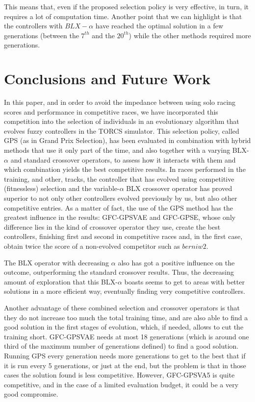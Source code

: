 \documentclass[10pt,journal,compsoc]{IEEEtran}
\begin{document}
This means that, even if the proposed selection policy is very effective, in turn, it requires a lot of computation time.
Another point that we can highlight is that the controllers with
$BLX-\alpha$ have reached the optimal solution in a few generations
(between the $7^{th}$ and the $20^{th}$) while the other methods required more
generations. 
\section{Conclusions and Future Work} 
\label{sec:conclusions}

In this paper, and in order to avoid the impedance between using solo
racing scores and performance in competitive races, we have
incorporated this competition into the selection of individuals in an
evolutionary algorithm that evolves fuzzy controllers in the TORCS
simulator. This selection policy, called GPS (as in Grand Prix
Selection), has been evaluated in combination with hybrid methods that
use it only part of the time, and also together with a varying
BLX-$\alpha$ and standard crossover operators, to assess how it
interacts with them and which combination yields the best competitive
results.
In races performed in the training, and other, tracks, the controller
that has evolved using competitive (fitnessless) selection and the
variable-$\alpha$ BLX crossover operator has proved superior to not
only other controllers evolved previously by us, but also other
competitive entries. As a matter of fact, the use of the GPS method has the greatest
influence in the results: {\sf GFC-GPSVAE} and {\sf GFC-GPSE}, whose only
difference lies in the kind of crossover operator they use, create the
best controllers, finishing first and second in competitive races and,
in the first case, obtain twice the score of a non-evolved
competitor such as $berniw2$.

The  BLX operator with decreasing $\alpha$ also has got a positive
influence on the outcome, outperforming the standard crossover
results. Thus, the decreasing amount of exploration that this BLX-$\alpha$ boasts seems to get to areas with better solutions in a
more efficient way, eventually finding very competitive controllers.

Another advantage of these combined selection and crossover operators is that they do not
increase too much the total training time, and are also able to find a
good solution in the first stages of evolution, which, if needed,
allows to cut the training short. {\sf GFC-GPSVAE} needs at most 18
generations (which is around one third of the maximum number of
generations defined) to find a good solution. Running GPS every
generation needs more generations to get to the best that if it is run
every 5 generations, or just at the end, but the problem is that in
those cases the solution found is less competitive. However, {\sf
  GFC-GPSVA5} is quite competitive, and in the case of a limited
evaluation budget, it could be a very good compromise.
\end{document}
